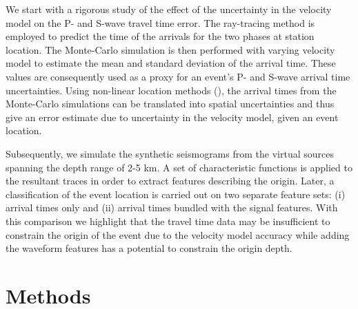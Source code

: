 \documentclass[letterpaper,11pt]{article}
\begin{document}
We start with a rigorous study of the effect of the uncertainty in the velocity model on the P- and S-wave travel time error. The ray-tracing method is employed to predict the time of the arrivals for the two phases at station location. The Monte-Carlo simulation is then performed with varying velocity model to estimate the mean and standard deviation of the arrival time. These values are consequently used as a proxy for an event's P- and S-wave arrival time uncertainties. Using non-linear location methods (\cite{lomax_precise_2001}), the arrival times from the Monte-Carlo simulations can be translated into spatial uncertainties and thus give an error estimate due to uncertainty in the velocity model, given an event location.

Subsequently, we simulate the synthetic seismograms from the virtual sources spanning the depth range of 2-5 km. A set of characteristic functions is applied to the resultant traces in order to extract features describing the origin. Later, a classification of the event location is carried out on two separate feature sets: (i) arrival times only and (ii) arrival times bundled with the signal features. With this comparison we highlight that the travel time data may be insufficient to constrain the origin of the event due to the velocity model accuracy while adding the waveform features has a potential to constrain the origin depth.

\section*{Methods}
\end{document}
